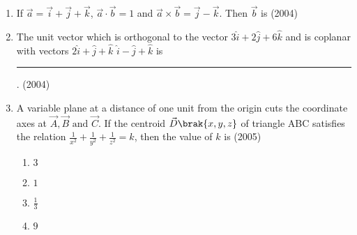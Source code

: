 \begin{enumerate}[label=\thesubsection.\arabic*.,ref=\thesubsection.\theenumi]
\begin{enumerate}
\end{enumerate}
\item If $\vec{a}=\vec{i}+\vec{j}+\vec{k}$, $\vec{a} \cdot \vec{b}=1$ and $\vec{a} \times \vec{b} = \vec{j} - \vec{k}$. Then $\vec{b}$ is 
\hfill (2004)
\begin{enumerate}
\end{enumerate}
    \item The unit vector which is orthogonal to the vector $3\hat{i} + 2\hat{j} + 6\hat{k}$ and is coplanar with vectors $2\hat{i} + \hat{j} + \hat{k}$  $\hat{i} - \hat{j} + \hat{k}$ is \rule{1cm}{0.01pt}.
    \hfill{(2004)}
    \iffalse
    \begin{multicols}{4}
    	\begin{enumerate}[itemsep=1ex]
    		\item $\frac{2\hat{i} - 6\hat{j} + \hat{k}}{\sqrt{41}}$
    		\item $\frac{2\hat{i} - 3\hat{j}}{\sqrt{13}}$
    		\item $\frac{3\hat{i} - \hat{k}}{\sqrt{10}}$
    		\item $\frac{4\hat{i} + 3\hat{j} - 3\hat{k}}{\sqrt{34}}$
    	\end{enumerate}
    \end{multicols}
\fi
    \item A variable plane at a distance of one unit from the origin cuts the coordinate axes at $\vec{A}, \vec{B} \text{ and } \vec{C}$. If the centroid $\vec{D} \brak{x,y,z}$ of triangle ABC satisfies the relation $\frac{1}{x^{2}} + \frac{1}{y^{2}} + \frac{1}{z^{2}} = k$, then the value of $k$ is
    \hfill{(2005)}
    \begin{multicols}{4}
    	\begin{enumerate}
    		\item $3$
    		\item $1$
    		\item $\frac{1}{3}$
    		\item $9$

\end{enumerate}
\end{multicols}
\end{enumerate}
